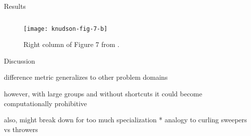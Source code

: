 \begin{frame}{Results}

\begin{figure}

\begin{columns}
\begin{column}{0.7\textwidth}
\texttt{[image: knudson-fig-7-b]}
\end{column}
\begin{column}{0.3\textwidth}
\caption{
Right column of Figure 7 from \cite{knudson2010coevolution}.
}
\end{column}
\end{columns}

\end{figure}

\end{frame}

\begin{frame}{Discussion}

difference metric generalizes to other problem domains

however, with large groups and without shortcuts it could become computationally prohibitive

also, might break down for too much specialization
* analogy to curling sweepers vs throwers

\end{frame}
